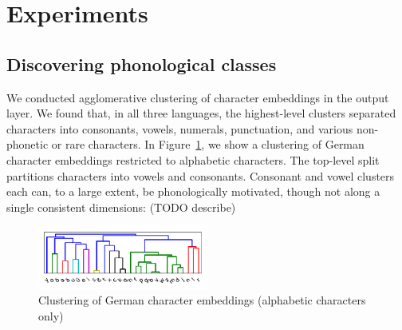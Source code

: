 

\section{Experiments}
\label{sec:experiments}


\subsection{Discovering phonological classes}

We conducted agglomerative clustering of character embeddings in the output layer.
We found that, in all three languages, the highest-level clusters separated characters into consonants, vowels, numerals, punctuation, and various non-phonetic or rare characters.
In Figure~\ref{fig:char-clustering}, we show a clustering of German character embeddings restricted to alphabetic characters.
The top-level split partitions characters into vowels and consonants.
Consonant and vowel clusters each can, to a large extent, be phonologically motivated, though not along a single consistent dimensions:
(TODO describe)
%
%
%

\begin{figure}
\includegraphics[width=0.50\textwidth]{figures/char-emb-clustering-output_output-phonetic-wiki-german-nospaces-bptt-910515909.pdf}
\caption{Clustering of German character embeddings (alphabetic characters only)}\label{fig:char-clustering}
\end{figure}




